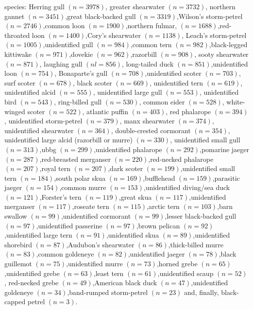 \documentclass{statsoc}\usepackage[]{graphicx}\usepackage[]{color}
\begin{document}
species: 
Herring gull $(n=3978)$, greater shearwater $(n=3732)$,
northern gannet $(n=3451)$,great black-backed gull $(n=3319)$,Wilson's storm-petrel $(n=2746)$,common loon $(n=1900)$,northern fulmar, $(n=1688)$,red-throated loon $(n=1400)$,Cory's shearwater $(n=1138)$, Leach's storm-petrel $(n=1005)$,unidentified gull $(n=984)$,common tern $(n=982)$,black-legged kittiwake $(n=971)$,dovekie $(n=962)$,razorbill $(n=908)$, sooty shearwater $(n=871)$, laughing gull $(nl=856)$, long-tailed duck $(n=851)$,unidentified loon $(n=754)$, Bonaparte's gull $(n=708)$,unidentified scoter $(n=703)$, surf scoter $(n=678)$,
black scoter $(n=669)$, unidentified tern $(n=619)$,
unidentified alcid $(n=555)$, unidentified large gull $(n=553)$, unidentified bird $(n=543)$, ring-billed gull $(n=530)$, common eider $(n=528)$, white-winged scoter $(n=522)$, atlantic puffin $(n=403)$, red phalarope $(n=394)$, unidentified storm-petrel $(n=379)$, manx shearwater $(n=374)$, unidentified shearwater $(n=364)$, double-crested cormorant $(n=354)$, unidentified large alcid (razorbill or murre) $(n=330)$, unidentified small gull $(n=313)$,ubbg $(n=299)$,unidentified phalarope $(n=292)$,pomarine jaeger $(n=287)$,red-breasted merganser $(n=220)$,red-necked phalarope $(n=207)$,royal tern $(n=207)$,dark scoter $(n=199)$,unidentified small tern $(n=184)$,south polar skua $(n=169)$,bufflehead $(n=159)$,parasitic jaeger $(n=154)$,common murre $(n=153)$,unidentified diving/sea duck $(n=121)$,Forster's tern $(n=119)$,great skua $(n=117)$,unidentified merganser $(n=117)$,roseate tern $(n=115)$,arctic tern $(n=103)$,barn swallow $(n=99)$,unidentified cormorant $(n=99)$,lesser black-backed gull $(n=97)$,unidentified passerine $(n=97)$,brown pelican $(n=92)$,unidentified large tern $(n=91)$,unidentified skua $(n=89)$,unidentified shorebird $(n=87)$,Audubon's shearwater $(n=86)$,thick-billed murre $(n=83)$,common goldeneye $(n=82)$,unidentified jaeger $(n=78)$,black guillemot $(n=75)$,unidentified murre $(n=73)$,horned grebe $(n=65)$,unidentified grebe $(n=63)$,least tern $(n=61)$,unidentified scaup $(n=52)$,
red-necked grebe $(n=49)$,American black duck $(n=47)$,unidentified goldeneye $(n=34)$,band-rumped storm-petrel $(n=23)$ and, finally,
black-capped petrel $(n=3)$.
\end{document}
